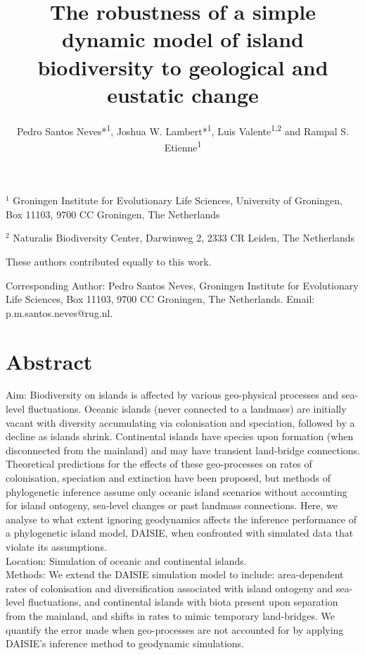 \documentclass{article}
\title{The robustness of a simple dynamic model of island biodiversity to geological and eustatic change}
\author{Pedro Santos Neves*\textsuperscript{1}, Joshua W. Lambert*\textsuperscript{1}, Luis Valente\textsuperscript{1,2} and Rampal S. Etienne\textsuperscript{1}}
\date{}
\begin{document}
\maketitle

\noindent $^{1}$ Groningen Institute for Evolutionary Life Sciences, University of
Groningen, Box 11103, 9700 CC Groningen, The Netherlands

\noindent $^{2}$ Naturalis Biodiversity Center, Darwinweg 2, 2333 CR Leiden, The Netherlands 

\noindent * These authors contributed equally to this work.

\noindent Corresponding Author: Pedro Santos Neves, Groningen Institute for Evolutionary Life Sciences, Box 11103, 9700 CC Groningen, The Netherlands. Email: p.m.santos.neves@rug.nl.

\section*{Abstract}

Aim: Biodiversity on islands is affected by various geo-physical processes and sea-level fluctuations. Oceanic islands (never connected to a landmass) are initially vacant with diversity accumulating via colonisation and speciation, followed by a decline as islands shrink. Continental islands have species upon formation (when disconnected from the mainland) and may have transient land-bridge connections. Theoretical predictions for the effects of these geo-processes on rates of colonisation, speciation and extinction have been proposed, but methods of phylogenetic inference assume only oceanic island scenarios without accounting for island ontogeny, sea-level changes or past landmass connections. Here, we analyse to what extent ignoring geodynamics affects the inference performance of a phylogenetic island model, DAISIE, when confronted with simulated data that violate its assumptions. \\

\noindent Location: Simulation of oceanic and continental islands. \\

\noindent Methods: We extend the DAISIE simulation model to include: area-dependent rates of colonisation and diversification associated with island ontogeny and sea-level fluctuations, and continental islands with biota present upon separation from the mainland, and shifts in rates to mimic temporary land-bridges. We quantify the error made when geo-processes are not accounted for by applying DAISIE’s inference method to geodynamic simulations. \\
\end{document}
